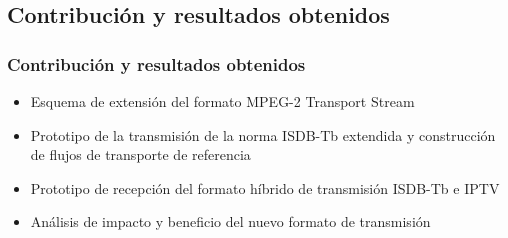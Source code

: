 \documentclass[a4paper,11pt]{beamer}
\begin{document}
	\subsection{Contribución y resultados obtenidos}
	\begin{frame}
		\frametitle{Contribución y resultados obtenidos}
		\begin{itemize}
			\item Esquema de extensión del formato MPEG-2 Transport Stream
			\item Prototipo de la transmisión de la norma ISDB-Tb extendida y construcción de flujos de transporte de referencia
			\item Prototipo de recepción del formato híbrido de transmisión ISDB-Tb e IPTV
			\item Análisis de impacto y beneficio del nuevo formato de transmisión
		\end{itemize}
	\end{frame}
\end{document}
